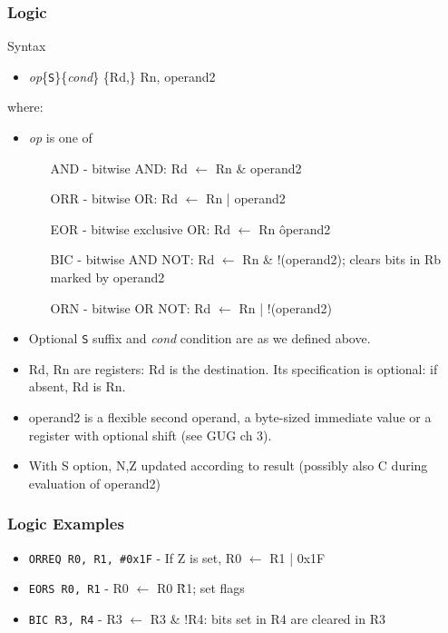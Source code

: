 \documentclass[10pt]{beamer}
\begin{document}
\begin{frame}
\frametitle{Logic}
Syntax
\begin{itemize}
\item \textit{op}\{\texttt{S}\}\{\textit{cond}\} \{Rd,\} Rn, operand2
\end{itemize}

where:
\begin{itemize}
\item \textit{op} is one of
  \begin{itemize}
  \item[AND] - bitwise AND: Rd $\leftarrow$ Rn \& operand2
  \item[ORR] - bitwise OR: Rd $\leftarrow$ Rn | operand2
  \item[EOR] - bitwise exclusive OR: Rd $\leftarrow$ Rn \^ operand2
  \item[BIC] - bitwise AND NOT: Rd $\leftarrow$ Rn \& !(operand2); clears bits in Rb marked by operand2
  \item[ORN] - bitwise OR NOT: Rd $\leftarrow$ Rn | !(operand2)
  \end{itemize}
\item Optional \texttt{S} suffix and \textit{cond} condition are as we defined above.
\item Rd, Rn are registers: Rd is the destination. Its specification is optional: if absent, Rd is Rn.
\item operand2 is a flexible second operand, a byte-sized immediate value or a register with optional shift (see GUG ch 3).
\item With S option, N,Z updated according to result (possibly also C during evaluation of operand2) 
\end{itemize}
\end{frame}

\begin{frame}
\frametitle{Logic Examples}
\begin{itemize}
\item \texttt{\color{brown}ORREQ R0, R1, \#0x1F} - If Z is set, R0 $\leftarrow$ R1 | 0x1F
\item \texttt{\color{brown}EORS R0, R1} - R0 $\leftarrow$ R0 \^ R1; set flags
\item \texttt{\color{brown}BIC R3, R4} - R3 $\leftarrow$ R3 \& !R4: bits set in R4 are cleared in R3
\end{itemize}
\end{frame}
\end{document}
